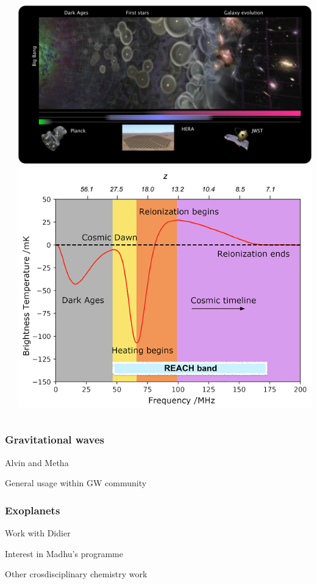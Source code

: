 \documentclass[aspectratio=169, handout]{beamer}
\begin{document}
\begin{frame}
\begin{columns}
\begin{itemize}
        \end{itemize}
        \includegraphics[width=\textwidth]{figures/21cm_1.png}
        \includegraphics[width=\textwidth]{figures/21cm.png}
    \end{columns}
\end{frame}

\begin{frame}
    \frametitle{Gravitational waves}
    Alvin and Metha

    General usage within GW community
\end{frame}

\begin{frame}
    \frametitle{Exoplanets}
    Work with Didier

    Interest in Madhu's programme

    Other crosdisciplinary chemistry work 
\end{frame}
\end{document}
